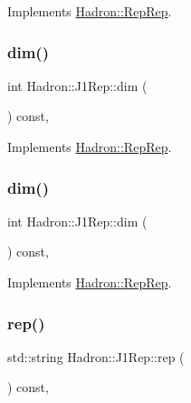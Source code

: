 Implements \mbox{\hyperlink{structHadron_1_1RepRep_a92c8802e5ed7afd7da43ccfd5b7cd92b}{Hadron\+::\+Rep\+Rep}}.

\mbox{\label{structHadron_1_1J1Rep_a59c9039238a259026aa68b2c30b3822a}} 
\subsubsection{\texorpdfstring{dim()}{dim()}\hspace{0.1cm}{\footnotesize\ttfamily [2/3]}}
{\footnotesize\ttfamily int Hadron\+::\+J1\+Rep\+::dim (\begin{DoxyParamCaption}{ }\end{DoxyParamCaption}) const\hspace{0.3cm}{\ttfamily [inline]}, {\ttfamily [virtual]}}



Implements \mbox{\hyperlink{structHadron_1_1RepRep_a92c8802e5ed7afd7da43ccfd5b7cd92b}{Hadron\+::\+Rep\+Rep}}.

\mbox{\label{structHadron_1_1J1Rep_a59c9039238a259026aa68b2c30b3822a}} 
\subsubsection{\texorpdfstring{dim()}{dim()}\hspace{0.1cm}{\footnotesize\ttfamily [3/3]}}
{\footnotesize\ttfamily int Hadron\+::\+J1\+Rep\+::dim (\begin{DoxyParamCaption}{ }\end{DoxyParamCaption}) const\hspace{0.3cm}{\ttfamily [inline]}, {\ttfamily [virtual]}}



Implements \mbox{\hyperlink{structHadron_1_1RepRep_a92c8802e5ed7afd7da43ccfd5b7cd92b}{Hadron\+::\+Rep\+Rep}}.

\mbox{\label{structHadron_1_1J1Rep_af725f8ff10c84cda5410728ce30697da}} 
\subsubsection{\texorpdfstring{rep()}{rep()}\hspace{0.1cm}{\footnotesize\ttfamily [1/3]}}
{\footnotesize\ttfamily std\+::string Hadron\+::\+J1\+Rep\+::rep (\begin{DoxyParamCaption}{ }\end{DoxyParamCaption}) const\hspace{0.3cm}{\ttfamily [inline]}, {\ttfamily [virtual]}}



